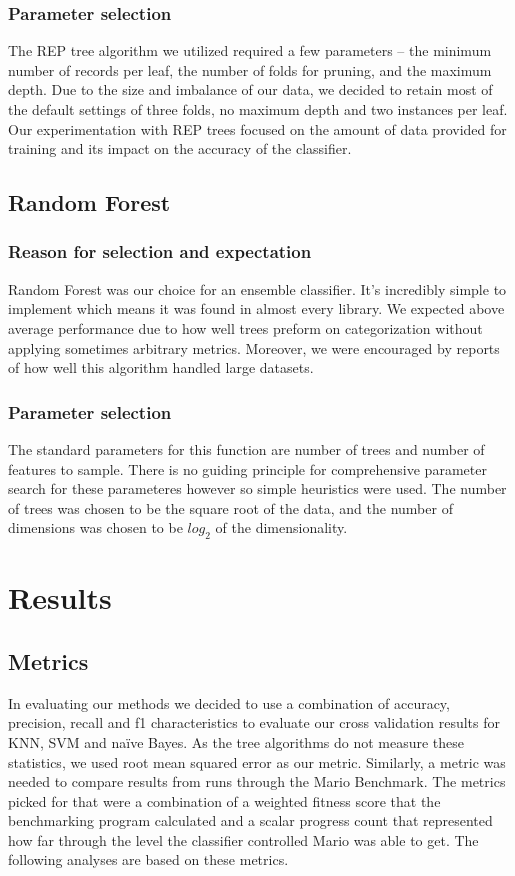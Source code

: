 \documentclass[]{article}   %
\begin{document}
\subsubsection{Parameter selection}
The REP tree algorithm we utilized required a few parameters -- the minimum number of records per leaf, the number 
of folds for pruning, and the maximum depth. Due to the size and imbalance of our data, we decided to retain most 
of the default settings of three folds, no maximum depth and two instances per leaf. Our experimentation with REP 
trees focused on the amount of data provided for training and its impact on the accuracy of the classifier.

\subsection{Random Forest}
\subsubsection{Reason for selection and expectation}
Random Forest was our choice for an ensemble classifier.  It's incredibly simple to implement which means it was found in almost every library.  We expected above average performance due to how well trees preform on categorization without applying sometimes arbitrary metrics.  Moreover, we were encouraged by reports of how well this algorithm handled large datasets.

\subsubsection{Parameter selection}
The standard parameters for this function are number of trees and number of features to sample.  There is no guiding principle for comprehensive parameter search for these parameteres however so simple heuristics were used.  The number of trees was chosen to be the square root of the data, and the number of dimensions was chosen to be $log_2$ of the dimensionality.

\section{Results}
\subsection{Metrics}
In evaluating our methods we decided to use a combination of accuracy, precision, recall and f1 characteristics to 
evaluate our cross validation results for KNN, SVM and na\"{i}ve Bayes. As the tree algorithms do not measure these
statistics, we used root mean squared error as our metric.
\newline\newline
Similarly, a metric was needed to compare results from runs through the Mario 
Benchmark. The metrics picked for that were a combination of a weighted fitness score that the benchmarking program 
calculated and a scalar progress count that represented how far through the level the classifier controlled Mario was 
able to get. The following analyses are based on these metrics.
\end{document}
